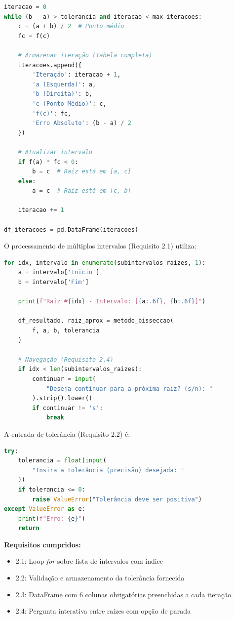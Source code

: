 \documentclass[
	12pt,				%
	openright,			%
	oneside,			%
	a4paper,			%
	english,			%
	brazil				%
	]{abntex2}
\begin{document}
\begin{lstlisting}[language=Python, caption={Requisito 2.3 - Ciclo Principal da Bisseção}]
iteracao = 0
while (b - a) > tolerancia and iteracao < max_iteracoes:
    c = (a + b) / 2  # Ponto médio
    fc = f(c)
    
    # Armazenar iteração (Tabela completa)
    iteracoes.append({
        'Iteração': iteracao + 1,
        'a (Esquerda)': a,
        'b (Direita)': b,
        'c (Ponto Médio)': c,
        'f(c)': fc,
        'Erro Absoluto': (b - a) / 2
    })
    
    # Atualizar intervalo
    if f(a) * fc < 0:
        b = c  # Raiz está em [a, c]
    else:
        a = c  # Raiz está em [c, b]
    
    iteracao += 1

df_iteracoes = pd.DataFrame(iteracoes)
\end{lstlisting}

O processamento de múltiplos intervalos (Requisito 2.1) utiliza:

\begin{lstlisting}[language=Python, caption={Requisito 2.1 - Iteração sobre Intervalos}]
for idx, intervalo in enumerate(subintervalos_raizes, 1):
    a = intervalo['Inicio']
    b = intervalo['Fim']
    
    print(f"Raiz #{idx} - Intervalo: [{a:.6f}, {b:.6f}]")
    
    df_resultado, raiz_aprox = metodo_bisseccao(
        f, a, b, tolerancia
    )
    
    # Navegação (Requisito 2.4)
    if idx < len(subintervalos_raizes):
        continuar = input(
            "Deseja continuar para a próxima raiz? (s/n): "
        ).strip().lower()
        if continuar != 's':
            break
\end{lstlisting}

A entrada de tolerância (Requisito 2.2) é:

\begin{lstlisting}[language=Python, caption={Requisito 2.2 - Configuração de Tolerância}]
try:
    tolerancia = float(input(
        "Insira a tolerância (precisão) desejada: "
    ))
    if tolerancia <= 0:
        raise ValueError("Tolerância deve ser positiva")
except ValueError as e:
    print(f"Erro: {e}")
    return
\end{lstlisting}

\vspace{0.3cm}

\textbf{Requisitos cumpridos:}
\begin{itemize}
    \item[✓] 2.1: Loop \textit{for} sobre lista de intervalos com índice
    \item[✓] 2.2: Validação e armazenamento da tolerância fornecida
    \item[✓] 2.3: DataFrame com 6 colunas obrigatórias preenchidas a cada iteração
    \item[✓] 2.4: Pergunta interativa entre raízes com opção de parada
\end{itemize}
\end{document}

